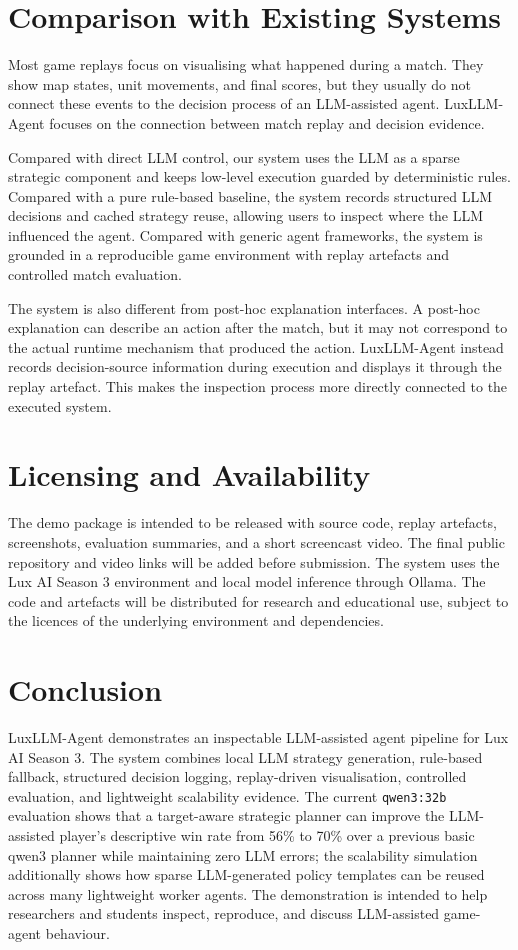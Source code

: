 \documentclass[11pt]{article}
\begin{document}
\section{Comparison with Existing Systems}

Most game replays focus on visualising what happened during a match. They show map states, unit movements, and final scores, but they usually do not connect these events to the decision process of an LLM-assisted agent. LuxLLM-Agent focuses on the connection between match replay and decision evidence.

Compared with direct LLM control, our system uses the LLM as a sparse strategic component and keeps low-level execution guarded by deterministic rules. Compared with a pure rule-based baseline, the system records structured LLM decisions and cached strategy reuse, allowing users to inspect where the LLM influenced the agent. Compared with generic agent frameworks, the system is grounded in a reproducible game environment with replay artefacts and controlled match evaluation.

The system is also different from post-hoc explanation interfaces. A post-hoc explanation can describe an action after the match, but it may not correspond to the actual runtime mechanism that produced the action. LuxLLM-Agent instead records decision-source information during execution and displays it through the replay artefact. This makes the inspection process more directly connected to the executed system.

\section{Licensing and Availability}

The demo package is intended to be released with source code, replay artefacts, screenshots, evaluation summaries, and a short screencast video. The final public repository and video links will be added before submission. The system uses the Lux AI Season 3 environment and local model inference through Ollama. The code and artefacts will be distributed for research and educational use, subject to the licences of the underlying environment and dependencies.

\section{Conclusion}

LuxLLM-Agent demonstrates an inspectable LLM-assisted agent pipeline for Lux AI Season 3. The system combines local LLM strategy generation, rule-based fallback, structured decision logging, replay-driven visualisation, controlled evaluation, and lightweight scalability evidence. The current \texttt{qwen3:32b} evaluation shows that a target-aware strategic planner can improve the LLM-assisted player's descriptive win rate from 56\% to 70\% over a previous basic qwen3 planner while maintaining zero LLM errors; the scalability simulation additionally shows how sparse LLM-generated policy templates can be reused across many lightweight worker agents. The demonstration is intended to help researchers and students inspect, reproduce, and discuss LLM-assisted game-agent behaviour.
\end{document}
